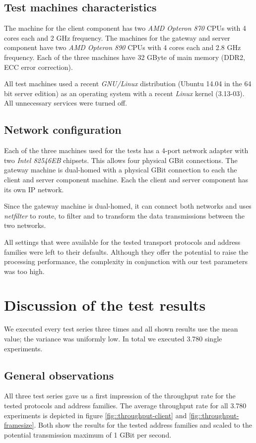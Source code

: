 \documentclass{sig-alternate}
\begin{document}
\subsection{Test machines characteristics}
\noindent The machine for the client component has two \emph{AMD Opteron 870} 
CPUs with 4 cores each and 2 GHz frequency. The machines for the gateway and 
server component have two \emph{AMD Opteron 890} CPUs with 4 cores each and 2.8 
GHz frequency. Each of the three machines have 32 GByte of main memory (DDR2, 
ECC error correction).

All test machines used a recent \emph{GNU/Linux} distribution (Ubuntu 14.04 in 
the 64 bit server edition) as an operating system with a recent \emph{Linux} 
kernel (3.13-03). All unnecessary services were turned off.

\subsection{Network configuration}
\noindent Each of the three machines used for the tests has a 4-port network 
adapter with two \emph{Intel 82546EB} chipsets. This allows four physical GBit 
connections. The gateway machine is dual-homed with a physical GBit connection 
to each the client and server component machine. Each the client and server 
component has its own IP network.

Since the gateway machine is dual-homed, it can connect both networks and uses 
\emph{netfilter} to route, to filter and to transform the data transmissions 
between the two networks.

All settings that were available for the tested transport protocols and 
address families were left to their defaults. Although they offer the potential 
to raise the processing performance, the complexity in conjunction with our 
test parameters was too high.

\newpage\section{Discussion of the test results}
\label{sec::results}
\noindent We executed every test series three times and all shown results use 
the mean value; the variance was uniformly low. In total we executed 3.780 
single experiments.

\subsection{General observations}
\noindent All three test series gave us a first impression of the throughput 
rate for the tested protocols and address families. The average throughput rate 
for all 3.780 experiments is depicted in figure \ref{fig::throughput-client} 
and \ref{fig::throughput-framesize}. Both show the results for the tested 
address families and scaled to the potential transmission maximum of 1 GBit per 
second. 
\end{document}
